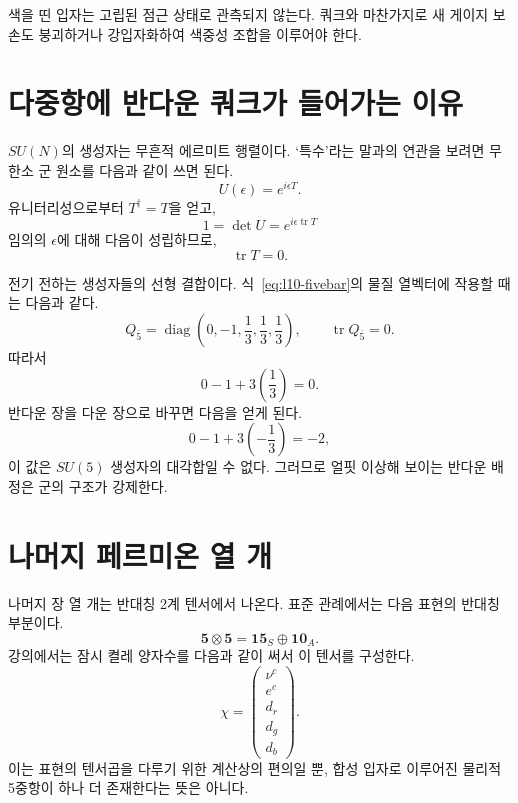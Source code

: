 색을 띤 입자는 고립된 점근 상태로 관측되지 않는다. 쿼크와 마찬가지로 새 게이지 보손도 붕괴하거나 강입자화하여 색중성 조합을 이루어야 한다.

\section{다중항에 반다운 쿼크가 들어가는 이유}

\(SU(N)\)의 생성자는 무흔적 에르미트 행렬이다. ‘특수’라는 말과의 연관을 보려면 무한소 군 원소를 다음과 같이 쓰면 된다.
\begin{equation}
U(\epsilon)=e^{i\epsilon T}.
\end{equation}
유니터리성으로부터 \(T^\dagger=T\)을 얻고,
\begin{equation}
1=\det U=e^{i\epsilon\operatorname{tr}T}
\end{equation}
임의의 \(\epsilon\)에 대해 다음이 성립하므로,
\begin{equation}
\operatorname{tr}T=0.
\label{eq:l10-traceless-generator}
\end{equation}

전기 전하는 생성자들의 선형 결합이다. 식~\eqref{eq:l10-fivebar}의 물질 열벡터에 작용할 때는 다음과 같다.
\begin{equation}
Q_{\overline5}
=
\operatorname{diag}
\left(0,-1,\frac13,\frac13,\frac13\right),
\qquad
\operatorname{tr}Q_{\overline5}=0.
\label{eq:l10-charge-fivebar}
\end{equation}
따라서
\begin{equation}
0-1+3\left(\frac13\right)=0.
\end{equation}
반다운 장을 다운 장으로 바꾸면 다음을 얻게 된다.
\begin{equation}
0-1+3\left(-\frac13\right)=-2,
\end{equation}
이 값은 \(SU(5)\) 생성자의 대각합일 수 없다. 그러므로 얼핏 이상해 보이는 반다운 배정은 군의 구조가 강제한다.

\section{나머지 페르미온 열 개}

나머지 장 열 개는 반대칭 2계 텐서에서 나온다. 표준 관례에서는 다음 표현의 반대칭 부분이다.
\begin{equation}
\mathbf5\otimes\mathbf5
=\mathbf{15}_S\oplus\mathbf{10}_A.
\label{eq:l10-five-five}
\end{equation}
강의에서는 잠시 켤레 양자수를 다음과 같이 써서 이 텐서를 구성한다.
\begin{equation}
\chi=
\begin{pmatrix}
\nu^c\\
e^c\\
d_r\\
d_g\\
d_b
\end{pmatrix}.
\label{eq:l10-aux-five}
\end{equation}
이는 표현의 텐서곱을 다루기 위한 계산상의 편의일 뿐, 합성 입자로 이루어진 물리적 5중항이 하나 더 존재한다는 뜻은 아니다.

